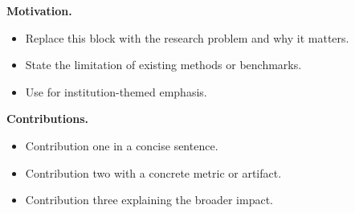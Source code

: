 \textbf{Motivation.}
\begin{itemize}
    \item Replace this block with the research problem and why it matters.
    \item State the limitation of existing methods or benchmarks.
    \item Use  for institution-themed emphasis.
\end{itemize}

\vspace{0.25cm}
\textbf{Contributions.}
\begin{itemize}
    \item Contribution one in a concise sentence.
    \item Contribution two with a concrete metric or artifact.
    \item Contribution three explaining the broader impact.
\end{itemize}
